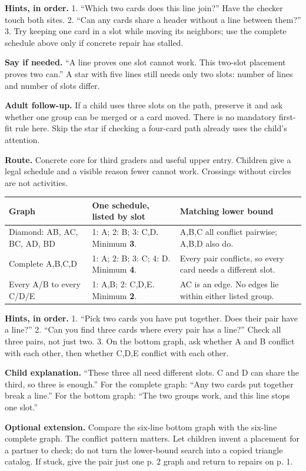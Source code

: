 \documentclass[10pt,letterpaper]{article}
\newcommand{\topic}[1]{\vspace{3pt}{\large\bfseries #1}\par}
\newcommand{\labelled}[2]{\textbf{#1} #2\par}
\newcommand{\hint}[1]{\textbf{Hints, in order.} #1\par}
\newcommand{\route}[1]{\textbf{Route.} #1\par}
\begin{document}
\hint{1. ``Which two cards does this line join?'' Have the checker touch both sites. 2. ``Can any cards share a header without a line between them?'' 3. Try keeping one card in a slot while moving its neighbors; use the complete schedule above only if concrete repair has stalled.}
\labelled{Say if needed.}{``A line proves one slot cannot work. This two-slot placement proves two can.'' A star with five lines still needs only two slots: number of lines and number of slots differ.}
\labelled{Adult follow-up.}{If a child uses three slots on the path, preserve it and ask whether one group can be merged or a card moved. There is no mandatory first-fit rule here. Skip the star if checking a four-card path already uses the child's attention.}
\topic{Student p. 2 / Problem 2: a minimum certificate}
\route{Concrete core for third graders and useful upper entry. Children give a legal schedule and a visible reason fewer cannot work. Crossings without circles are not activities.}
\begin{tabularx}{\linewidth}{@{}p{1.12in}Xp{1.35in}@{}}
\toprule
Graph & One schedule, listed by slot & Matching lower bound \\
\midrule
Diamond: AB, AC, BC, AD, BD & 1: A; 2: B; 3: C,D. Minimum \textbf{3}. & A,B,C all conflict pairwise; A,B,D also do. \\
Complete A,B,C,D & 1: A; 2: B; 3: C; 4: D. Minimum \textbf{4}. & Every pair conflicts, so every card needs a different slot. \\
Every A/B to every C/D/E & 1: A,B; 2: C,D,E. Minimum \textbf{2}. & AC is an edge. No edges lie within either listed group. \\
\bottomrule
\end{tabularx}\par\smallskip
\hint{1. ``Pick two cards you have put together. Does their pair have a line?'' 2. ``Can you find three cards where every pair has a line?'' Check all three pairs, not just two. 3. On the bottom graph, ask whether A and B conflict with each other, then whether C,D,E conflict with each other.}
\labelled{Child explanation.}{``These three all need different slots. C and D can share the third, so three is enough.'' For the complete graph: ``Any two cards put together break a line.'' For the bottom graph: ``The two groups work, and this line stops one slot.''}
\labelled{Optional extension.}{Compare the six-line bottom graph with the six-line complete graph. The conflict pattern matters. Let children invent a placement for a partner to check; do not turn the lower-bound search into a copied triangle catalog. If stuck, give the pair just one p. 2 graph and return to repairs on p. 1.}
\end{document}
